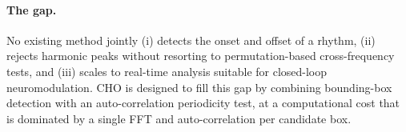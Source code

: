 \paragraph{The gap.} No existing method jointly (i) detects the onset and offset of a rhythm, (ii) rejects harmonic peaks without resorting to permutation-based cross-frequency tests, and (iii) scales to real-time analysis suitable for closed-loop neuromodulation. CHO is designed to fill this gap by combining bounding-box detection with an auto-correlation periodicity test, at a computational cost that is dominated by a single FFT and auto-correlation per candidate box.
